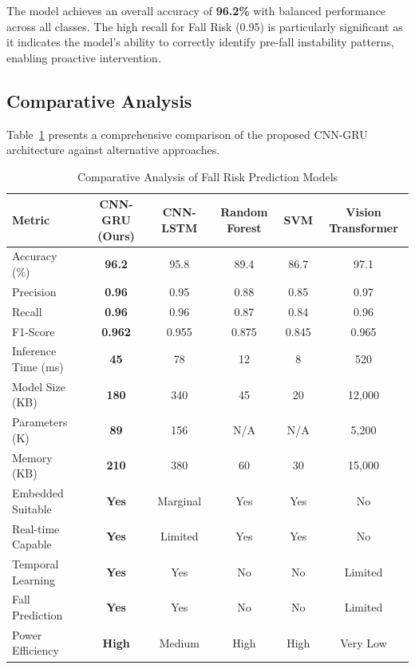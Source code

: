 \documentclass[conference]{IEEEtran}
\begin{document}
The model achieves an overall accuracy of \textbf{96.2\%} with balanced performance across all classes. The high recall for Fall Risk (0.95) is particularly significant as it indicates the model's ability to correctly identify pre-fall instability patterns, enabling proactive intervention.

\subsection{Comparative Analysis}

Table~\ref{tab:comparison} presents a comprehensive comparison of the proposed CNN-GRU architecture against alternative approaches.

\begin{table}[!t]
\caption{Comparative Analysis of Fall Risk Prediction Models}
\label{tab:comparison}
\centering
\begin{tabular}{|l|c|c|c|c|c|}
\hline
\textbf{Metric} & \textbf{CNN-GRU (Ours)} & \textbf{CNN-LSTM} & \textbf{Random Forest} & \textbf{SVM} & \textbf{Vision Transformer} \\
\hline
Accuracy (\%) & \textbf{96.2} & 95.8 & 89.4 & 86.7 & 97.1 \\
\hline
Precision & \textbf{0.96} & 0.95 & 0.88 & 0.85 & 0.97 \\
\hline
Recall & \textbf{0.96} & 0.96 & 0.87 & 0.84 & 0.96 \\
\hline
F1-Score & \textbf{0.962} & 0.955 & 0.875 & 0.845 & 0.965 \\
\hline
Inference Time (ms) & \textbf{45} & 78 & 12 & 8 & 520 \\
\hline
Model Size (KB) & \textbf{180} & 340 & 45 & 20 & 12,000 \\
\hline
Parameters (K) & \textbf{89} & 156 & N/A & N/A & 5,200 \\
\hline
Memory (KB) & \textbf{210} & 380 & 60 & 30 & 15,000 \\
\hline
Embedded Suitable & \textbf{Yes} & Marginal & Yes & Yes & No \\
\hline
Real-time Capable & \textbf{Yes} & Limited & Yes & Yes & No \\
\hline
Temporal Learning & \textbf{Yes} & Yes & No & No & Limited \\
\hline
Fall Prediction & \textbf{Yes} & Yes & No & No & Limited \\
\hline
Power Efficiency & \textbf{High} & Medium & High & High & Very Low \\
\hline
\end{tabular}
\end{table}
\end{document}
